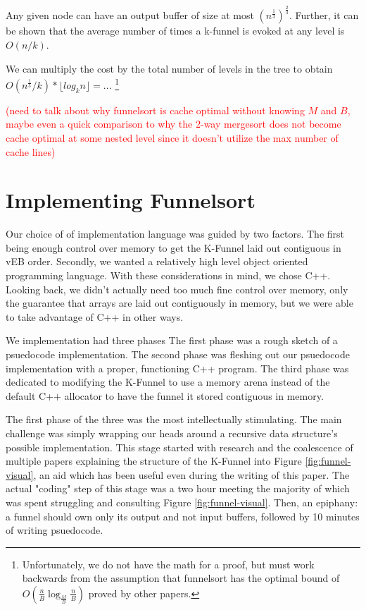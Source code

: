 \documentclass[11pt, letterpaper]{article}
\begin{document}
Any given node can have an output buffer of size at most $(n^\frac{1}{3})^\frac{2}{3}$. Further, it can be shown that the average number of times a k-funnel is evoked at any level is $O(n/k)$.

We can multiply the cost by the total number of levels in the tree to obtain $O(n^\frac{1}{3}/k) * \lfloor log_kn \rfloor = ...$
\footnote{Unfortunately, we do not have the math for a proof, but must work backwards from the assumption that funnelsort has the optimal bound of $O(\frac{n}{B}\log_\frac{M}{B}\frac{n}{B})$ proved by other papers.} 




\textcolor{red}{(need to talk about why funnelsort is cache optimal without knowing $M$ and $B$, maybe even a quick comparison to why the $2$-way mergesort does not become cache optimal at some nested level since it doesn't utilize the max number of cache lines)}

\section{Implementing Funnelsort}
Our choice of of implementation language was guided by two factors. The first being enough control over memory to get the K-Funnel laid out contiguous in vEB order. Secondly, we wanted a relatively high level object oriented programming language. With these considerations in mind, we chose C++. Looking back, we didn't actually need too much fine control over memory, only the guarantee that arrays are laid out contiguously in memory, but we were able to take advantage of C++ in other ways.

We implementation had three phases
The first phase was a rough sketch of a psuedocode implementation. The second phase was fleshing out our psuedocode implementation with a proper, functioning C++ program. The third phase was dedicated to modifying the K-Funnel to use a memory arena instead of the default C++ allocator to have the funnel it stored contiguous in memory.

The first phase of the three was the most intellectually stimulating. The main challenge was simply wrapping our heads around a recursive data structure's possible implementation. This stage started with research and the coalescence of multiple papers explaining the structure of the K-Funnel into Figure \ref{fig:funnel-visual}, an aid which has been useful even during the writing of this paper. The actual "coding" step of this stage was a two hour meeting the majority of which was spent struggling and consulting Figure \ref{fig:funnel-visual}. Then, an epiphany: a funnel should own only its output and not input buffers, followed by 10 minutes of writing psuedocode.
\end{document}

